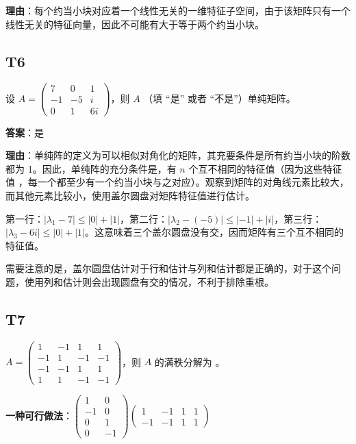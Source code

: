 \documentclass{article}
\begin{document}
\par \textbf{理由}：每个约当小块对应着一个线性无关的一维特征子空间，由于该矩阵只有一个线性无关的特征向量，因此不可能有大于等于两个约当小块。

\subsection{T6}

\par 设 $A=\begin{pmatrix}
	7 & 0 & 1\\
	-1 & -5 & i\\
	0 & 1 & 6i
\end{pmatrix}$，则 $A$ \underline{\phantom{empty\_space}}（填 “是” 或者 “不是”）单纯矩阵。

\par \textbf{答案}：是

\par \textbf{理由}：单纯阵的定义为可以相似对角化的矩阵，其充要条件是所有约当小块的阶数都为 1。因此，单纯阵的充分条件是，有 $n$ 个互不相同的特征值（因为这些特征值 ，每一个都至少有一个约当小块与之对应）。观察到矩阵的对角线元素比较大，而其他元素比较小，使用盖尔圆盘对矩阵特征值进行估计。

第一行：$|\lambda_1-7|\leq |0| + |1|$，第二行：$|\lambda_2-(-5)|\leq |-1| + |i|$，第三行：$|\lambda_3-6i|\leq |0| + |1|$。这意味着三个盖尔圆盘没有交，因而矩阵有三个互不相同的特征值。

需要注意的是，盖尔圆盘估计对于行和估计与列和估计都是正确的，对于这个问题，使用列和估计则会出现圆盘有交的情况，不利于排除重根。

\subsection{T7}

\par $A=\begin{pmatrix}
	1 & -1 & 1 & 1\\
	-1 & 1 & -1 & -1\\
	-1 & -1 & 1 & 1\\
	1 & 1 & -1 & -1
\end{pmatrix}$，则 $A$ 的满秩分解为 \underline{\phantom{empty\_space}}。

\par \textbf{一种可行做法}：$\begin{pmatrix}
	1 & 0\\
	-1 & 0\\
	0 & 1\\
	0 & -1
\end{pmatrix} \begin{pmatrix}
	1 & -1 & 1 & 1\\
	-1 & -1 & 1 & 1
\end{pmatrix}$
\end{document}
